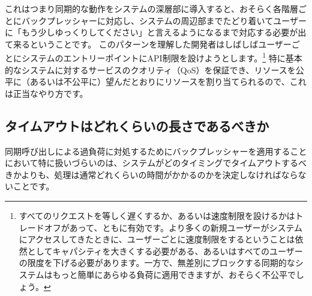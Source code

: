 これはつまり同期的な動作をシステムの深層部に導入すると、おそらく各階層ごとにバックプレッシャーに対応し、システムの周辺部までたどり着いてユーザーに「もう少しゆっくりしてください」と言えるようになるまで対応する必要が出て来るということです。
このパターンを理解した開発者はしばしばユーザーごとにシステムのエントリーポイントにAPI制限を設けようとします。\footnote{すべてのリクエストを等しく遅くするか、あるいは速度制限を設けるかはトレードオフがあって、ともに有効です。より多くの新規ユーザーがシステムにアクセスしてきたときに、ユーザーごとに速度制限をするということは依然としてキャパシティを大きくする必要がある、あるいはすべてのユーザーの限度を下げる必要があります。一方で、無差別にブロックする同期的なシステムはもっと簡単にあらゆる負荷に適用できますが、おそらく不公平でしょう。}
特に基本的なシステムに対するサービスのクオリティ（QoS）を保証でき、リソースを公平に（あるいは不公平に）望んだとおりにリソースを割り当てられるので、これは正当なやり方です。

\subsection{タイムアウトはどれくらいの長さであるべきか}

同期呼び出しによる過負荷に対処するためにバックプレッシャーを適用することにおいて特に扱いづらいのは、システムがどのタイミングでタイムアウトするべきかよりも、処理は通常どれくらいの時間がかかるのかを決定しなければならないことです。


